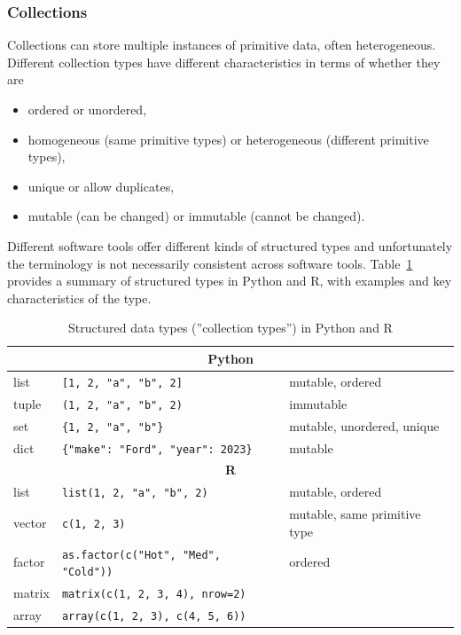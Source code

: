 \begin{withcode}
\subsubsection*{Collections}

Collections can store multiple instances of primitive data, often heterogeneous. Different collection types have different characteristics in terms of whether they are 

\begin{itemize}
\item ordered or unordered, 
\item homogeneous (same primitive types) or heterogeneous (different primitive types), 
\item unique or allow duplicates, 
\item mutable (can be changed) or immutable (cannot be changed). 
\end{itemize}

Different software tools offer different kinds of structured types and unfortunately the terminology is not necessarily consistent across software tools. Table~\ref{tab:structured} provides a summary of structured types in Python and R, with examples and key characteristics of the type.

\begin{table}
\renewcommand{\arraystretch}{1.25}
\footnotesize
\centering

\begin{tabular}{l|l|l} \hline
\multicolumn{3}{c}{\textbf{Python}} \\ \hline
list\index{List (in Python)} & \texttt{[1, 2, "a", "b", 2]} & mutable, ordered \\
tuple\index{Tuple (in Python)} & \texttt{(1, 2, "a", "b", 2)} & immutable \\
set\index{Set (in Python)} & \texttt{\{1, 2, "a", "b"\}} &  mutable, unordered, unique \\
dict\index{Dictionary (in Python)} & \texttt{\{"make": "Ford", "year": 2023\}} & mutable \\ \hline
\multicolumn{3}{c}{\textbf{R}} \\ \hline 
list\index{List (in R)} & \texttt{list(1, 2, "a", "b", 2)} & mutable, ordered \\
vector\index{Vector (in R)} & \texttt{c(1, 2, 3)} & mutable, same primitive type \\
factor\index{Factor (in R)} & \texttt{as.factor(c("Hot", "Med", "Cold"))} & ordered\\
matrix\index{Matrix (in R)} & \texttt{matrix(c(1, 2, 3, 4), nrow=2)} & \\
array\index{Array (in R)} & \texttt{array(c(1, 2, 3), c(4, 5, 6))} \\ \hline
\end{tabular}
\caption{Structured data types (''collection types'') in Python and R}
\label{tab:structured}
\end{table}
\end{withcode}

